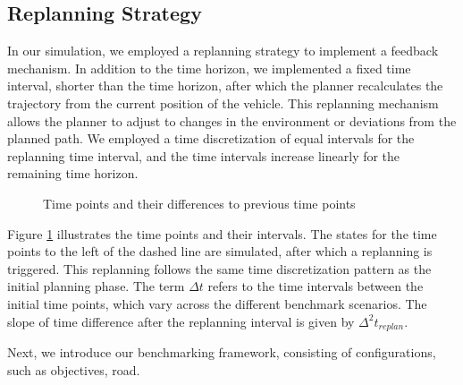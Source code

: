 \subsection{Replanning Strategy}

In our simulation, we employed a replanning strategy to implement a feedback mechanism.
In addition to the time horizon, we implemented a fixed time interval, shorter than the time horizon, after which the planner recalculates the
trajectory from the current position of the vehicle.
This replanning mechanism allows the planner to adjust to changes in the environment or deviations from the planned path.
We employed a time discretization of equal intervals for the replanning time interval, and the time intervals increase linearly for the remaining
time horizon.

\begin{figure}[h]
	\centering
	\caption{Time points and their differences to previous time points}
	\label{fig:time_points}
\end{figure}

Figure \ref{fig:time_points} illustrates the time points and their intervals.
The states for the time points to the left of the dashed line are simulated, after which a replanning is triggered.
This replanning follows the same time discretization pattern as the initial planning phase.
The term $\Delta t$ refers to the time intervals between the initial time points, which vary across the different benchmark scenarios.
The slope of time difference after the replanning interval is given by $\Delta^2 t_{replan}$.

Next, we introduce our benchmarking framework, consisting of configurations, such as objectives, road.
